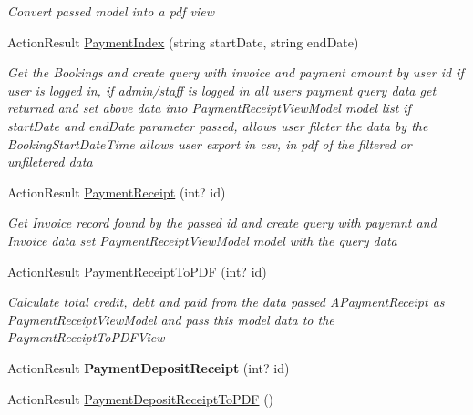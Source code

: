 \begin{DoxyCompactItemize}
\begin{DoxyCompactList}\small\item\em Convert passed model into a pdf view \end{DoxyCompactList}\item 
Action\+Result \hyperlink{class_alfa_accounting_1_1_controllers_1_1_booking_view_models_controller_a0ed146c62729d4e05b0bc7b532319ed8}{Payment\+Index} (string start\+Date, string end\+Date)
\begin{DoxyCompactList}\small\item\em Get the Bookings and create query with invoice and payment amount by user id if user is logged in, if admin/staff is logged in all user\textquotesingle{}s payment query data get returned and set above data into Payment\+Receipt\+View\+Model model list if start\+Date and end\+Date parameter passed, allows user fileter the data by the Booking\+Start\+Date\+Time allows user export in csv, in pdf of the filtered or unfiletered data \end{DoxyCompactList}\item 
Action\+Result \hyperlink{class_alfa_accounting_1_1_controllers_1_1_booking_view_models_controller_ac228b95707fb10fe6aca1e4cacc2be6d}{Payment\+Receipt} (int? id)
\begin{DoxyCompactList}\small\item\em Get Invoice record found by the passed id and create query with payemnt and Invoice data set Payment\+Receipt\+View\+Model model with the query data \end{DoxyCompactList}\item 
Action\+Result \hyperlink{class_alfa_accounting_1_1_controllers_1_1_booking_view_models_controller_af89a68f628793df0d1b8b3167686b33e}{Payment\+Receipt\+To\+P\+DF} (int? id)
\begin{DoxyCompactList}\small\item\em Calculate total credit, debt and paid from the data passed A\+Payment\+Receipt as Payment\+Receipt\+View\+Model and pass this model data to the Payment\+Receipt\+To\+P\+D\+F\+View \end{DoxyCompactList}\item 
\mbox{\label{class_alfa_accounting_1_1_controllers_1_1_booking_view_models_controller_abe5d4ebb87b5c0e91f2617edd686509d}} 
Action\+Result {\bfseries Payment\+Deposit\+Receipt} (int? id)
\item 
Action\+Result \hyperlink{class_alfa_accounting_1_1_controllers_1_1_booking_view_models_controller_a457bd52267b9065f75bbe5a82faeee02}{Payment\+Deposit\+Receipt\+To\+P\+DF} ()

\end{DoxyCompactItemize}

